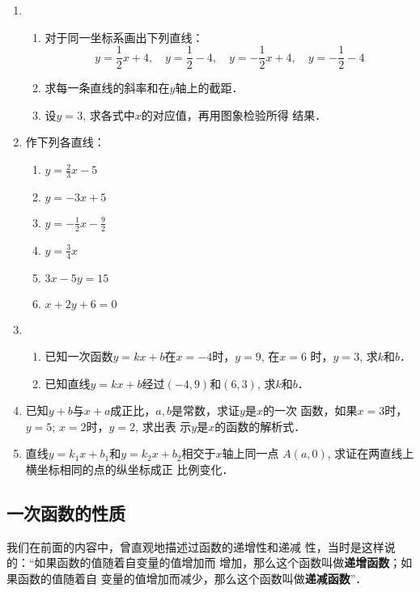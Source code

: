 \begin{ex}
\begin{enumerate}
    \item \begin{enumerate}
        \item 对于同一坐标系画出下列直线：
\[y=\frac{1}{2}x+4,\quad y=\frac{1}{2}-4,\quad y=-\frac{1}{2}x+4,\quad y=-\frac{1}{2}-4\]
\item 求每一条直线的斜率和在$y$轴上的截距．
\item 设$y=3$, 求各式中$x$的对应值，再用图象检验所得
结果．
    \end{enumerate}
    \item 作下列各直线：
\begin{multicols}{2}
    \begin{enumerate}
        \item $y=\frac{2}{3}x-5$
        \item $y=-3x+5$
        \item $y=-\frac{1}{2}x-\frac{9}{2}$
        \item $y=\frac{3}{4}x$
        \item $3x-5y=15$
        \item $x+2y+6=0$
    \end{enumerate}
\end{multicols}

\item \begin{enumerate}
    \item 已知一次函数$y=kx+b$在$x=-4$时，$y=9$, 在$x=6$
时，$y=3$, 求$k$和$b$．
\item 已知直线$y=kx+b$经过$(-4,9)$和$(6,3)$, 求$k$和$b$．
\end{enumerate}

\item 已知$y+b$与$x+a$成正比，$a,b$是常数，求证$y$是$x$的一次
函数，如果$x=3$时，$y=5$; $x=2$时，$y=2$, 求出表
示$y$是$x$的函数的解析式．
\item 直线$y=k_1x+b_1$和$y=k_2x+b_2$相交于$x$轴上同一点
$A(a,0)$, 求证在两直线上横坐标相同的点的纵坐标成正
比例变化．
\end{enumerate}
\end{ex}

\subsection{一次函数的性质}
我们在前面的内容中，曾直观地描述过函数的递增性和递减
性，当时是这样说的：“如果函数的值随着自变量的值增加而
增加，那么这个函数叫做\textbf{递增函数}；如果函数的值随着自
变量的值增加而减少，那么这个函数叫做\textbf{递减函数}”．

